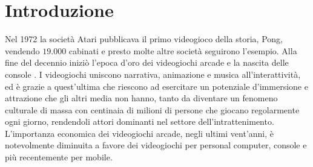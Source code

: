 %
%

\chapter*{Introduzione}





Nel 1972 la società Atari pubblicava il primo videogioco della storia, Pong, vendendo $19.000$ cabinati e presto molte altre società seguirono l'esempio. Alla fine del decennio iniziò l'epoca d'oro dei videogiochi arcade e la nascita delle console \parencite{High_Score}. I videogiochi uniscono narrativa, animazione e musica all'interattività, ed è grazie a quest'ultima che riescono ad esercitare un potenziale d'immersione e attrazione che gli altri media non hanno, tanto da diventare un fenomeno culturale di massa con centinaia di milioni di persone che giocano regolarmente ogni giorno, rendendoli attori dominanti nel settore dell'intrattenimento. L'importanza economica dei videogiochi arcade, negli ultimi vent'anni, è notevolmente diminuita a favore dei videogiochi per personal computer, console e più recentemente per mobile.

